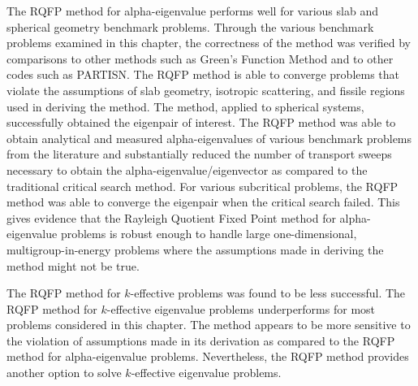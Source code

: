 The RQFP method for alpha-eigenvalue performs well for various slab and spherical geometry benchmark problems. Through the various benchmark problems examined in this chapter, the correctness of the method was verified by comparisons to other methods such as Green's Function Method and to other codes such as PARTISN. The RQFP method is able to converge problems that violate the assumptions of slab geometry, isotropic scattering, and fissile regions used in deriving the method. The method, applied to spherical systems, successfully obtained the eigenpair of interest. The RQFP method was able to obtain analytical and measured alpha-eigenvalues of various benchmark problems from the literature and substantially reduced the number of transport sweeps necessary to obtain the alpha-eigenvalue/eigenvector as compared to the traditional critical search method. For various subcritical problems, the RQFP method was able to converge the eigenpair when the critical search failed. This gives evidence that the Rayleigh Quotient Fixed Point method for alpha-eigenvalue problems is robust enough to handle large one-dimensional, multigroup-in-energy problems where the assumptions made in deriving the method might not be true.

The RQFP method for $k$-effective problems was found to be less successful. The RQFP method for $k$-effective eigenvalue problems underperforms for most problems considered in this chapter. The method appears to be more sensitive to the violation of assumptions made in its derivation as compared to the RQFP method for alpha-eigenvalue problems. Nevertheless, the RQFP method provides another option to solve $k$-effective eigenvalue problems.

%
